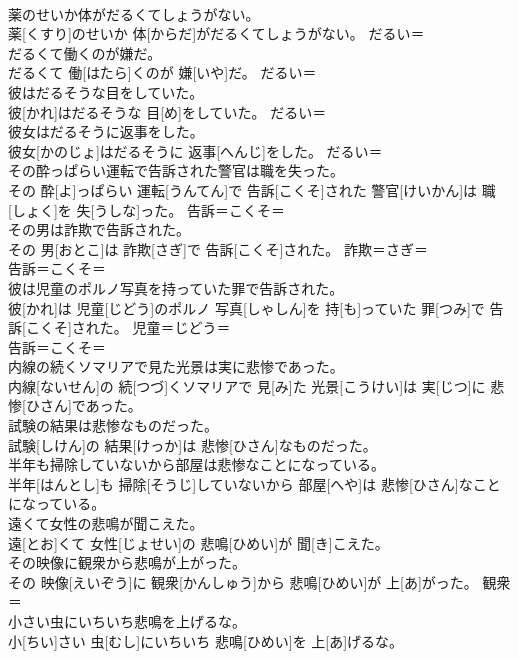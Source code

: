\documentclass[8pt]{extreport}
\begin{document}
\begin{CJK}{UTF8}{min}
\\	薬のせいか体がだるくてしょうがない。	
\\	薬[くすり]のせいか 体[からだ]がだるくてしょうがない。	だるい＝ 
\\	だるくて働くのが嫌だ。	
\\	だるくて 働[はたら]くのが 嫌[いや]だ。	だるい＝ 
\\	彼はだるそうな目をしていた。	
\\	彼[かれ]はだるそうな 目[め]をしていた。	だるい＝ 
\\	彼女はだるそうに返事をした。	
\\	彼女[かのじょ]はだるそうに 返事[へんじ]をした。	だるい＝ 
\\	その酔っぱらい運転で告訴された警官は職を失った。	
\\	その 酔[よ]っぱらい 運転[うんてん]で 告訴[こくそ]された 警官[けいかん]は 職[しょく]を 失[うしな]った。	告訴＝こくそ＝ 
\\	その男は詐欺で告訴された。	
\\	その 男[おとこ]は 詐欺[さぎ]で 告訴[こくそ]された。	詐欺＝さぎ＝ 
\\	告訴＝こくそ＝ 
\\	彼は児童のポルノ写真を持っていた罪で告訴された。	
\\	彼[かれ]は 児童[じどう]のポルノ 写真[しゃしん]を 持[も]っていた 罪[つみ]で 告訴[こくそ]された。	児童＝じどう＝ 
\\	告訴＝こくそ＝ 
\\	内線の続くソマリアで見た光景は実に悲惨であった。	
\\	内線[ないせん]の 続[つづ]くソマリアで 見[み]た 光景[こうけい]は 実[じつ]に 悲惨[ひさん]であった。	
\\	試験の結果は悲惨なものだった。	
\\	試験[しけん]の 結果[けっか]は 悲惨[ひさん]なものだった。	
\\	半年も掃除していないから部屋は悲惨なことになっている。	
\\	半年[はんとし]も 掃除[そうじ]していないから 部屋[へや]は 悲惨[ひさん]なことになっている。	
\\	遠くて女性の悲鳴が聞こえた。	
\\	遠[とお]くて 女性[じょせい]の 悲鳴[ひめい]が 聞[き]こえた。	
\\	その映像に観衆から悲鳴が上がった。	
\\	その 映像[えいぞう]に 観衆[かんしゅう]から 悲鳴[ひめい]が 上[あ]がった。	観衆＝ 
\\	小さい虫にいちいち悲鳴を上げるな。	
\\	小[ちい]さい 虫[むし]にいちいち 悲鳴[ひめい]を 上[あ]げるな。	

\end{CJK}
\end{document}
